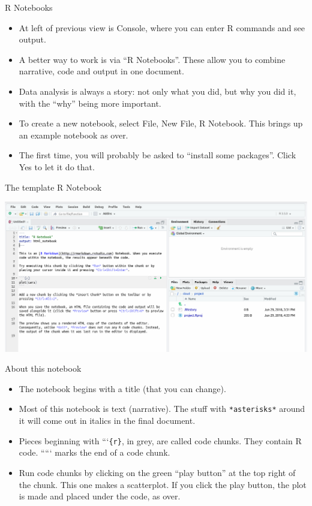 \documentclass[ignorenonframetext,]{beamer}
\providecommand{\tightlist}{%
  \setlength{\itemsep}{0pt}\setlength{\parskip}{0pt}}
\begin{document}
\begin{frame}{R Notebooks}
\protect\hypertarget{r-notebooks}{}

\begin{itemize}
\tightlist
\item
  At left of previous view is Console, where you can enter R commands
  and see output.
\item
  A better way to work is via ``R Notebooks''. These allow you to
  combine narrative, code and output in one document.
\item
  Data analysis is always a story: not only what you did, but why you
  did it, with the ``why'' being more important.
\item
  To create a new notebook, select File, New File, R Notebook. This
  brings up an example notebook as over.
\item
  The first time, you will probably be asked to ``install some
  packages''. Click Yes to let it do that.
\end{itemize}

\end{frame}

\begin{frame}{The template R Notebook}
\protect\hypertarget{the-template-r-notebook}{}

\includegraphics{Screenshot_2018-06-29_16-40-36.png}

\end{frame}

\begin{frame}[fragile]{About this notebook}
\protect\hypertarget{about-this-notebook}{}

\begin{itemize}
\tightlist
\item
  The notebook begins with a title (that you can change).
\item
  Most of this notebook is text (narrative). The stuff with
  \texttt{*asterisks*} around it will come out in italics in the final
  document.
\item
  Pieces beginning with ```\texttt{\{r\}}, in grey, are called code
  chunks. They contain R code. ````` marks the end of a code chunk.
\item
  Run code chunks by clicking on the green ``play button'' at the top
  right of the chunk. This one makes a scatterplot. If you click the
  play button, the plot is made and placed under the code, as over.
\end{itemize}

\end{frame}
\end{document}
